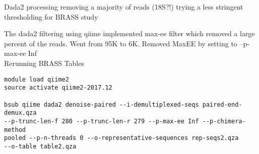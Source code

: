 \documentclass[idxtotoc,hyperref,openany,oneside]{labbook} %
\begin{document}
Dada2 processing removing a majority of reads (18S?!) trying a less stringent thresholding for BRASS study



The dada2 filtering using qiime implemented max-ee filter which removed a large percent of the reads. Went from 95K to 6K. Removed MaxEE by setting to --p-max-ee Inf
\\

Rerunning BRASS Tables
\begin{verbatim}
module load qiime2
source activate qiime2-2017.12

bsub qiime dada2 denoise-paired --i-demultiplexed-seqs paired-end-demux.qza 
--p-trunc-len-f 280 --p-trunc-len-r 279 --p-max-ee Inf --p-chimera-method 
pooled --p-n-threads 0 --o-representative-sequences rep-seqs2.qza 
--o-table table2.qza


\end{verbatim}
\end{document}
